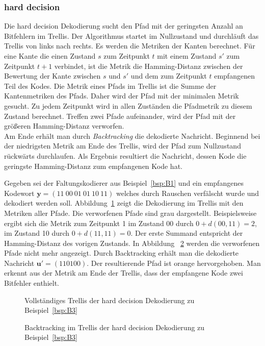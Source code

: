 \subsubsection{hard decision}
\label{kapitel:grundlagen_hard_decision}
Die hard decision Dekodierung sucht den Pfad mit der geringsten Anzahl an Bitfehlern im Trellis. Der Algorithmus startet im Nullzustand und durchläuft das Trellis von links nach rechts. Es werden die Metriken der Kanten berechnet. Für eine Kante die einen Zustand $s$ zum Zeitpunkt $t$ mit einem Zustand $s'$ zum Zeitpunkt $t+1$ verbindet, ist die Metrik die Hamming-Distanz zwischen der Bewertung der Kante zwischen $s$ und $s'$ und dem zum Zeitpunkt $t$ empfangenen Teil des Kodes. Die Metrik eines Pfads im Trellis ist die Summe der Kantenmetriken des Pfads. Daher wird der Pfad mit der minimalen Metrik gesucht. Zu jedem Zeitpunkt wird in allen Zuständen die Pfadmetrik zu diesem Zustand berechnet. Treffen zwei Pfade aufeinander, wird der Pfad mit der größeren Hamming-Distanz verworfen.
\\
Am Ende erhält man durch \emph{Backtracking} die dekodierte Nachricht. Beginnend bei der niedrigsten Metrik am Ende des Trellis, wird der Pfad zum Nullzustand rückwärts durchlaufen. Als Ergebnis resultiert die Nachricht, dessen Kode die geringste Hamming-Distanz zum empfangenen Kode hat.
\begin{beispiel}
Gegeben sei der Faltungskodierer aus Beispiel~\ref{bsp:B1} und ein empfangenes Kodewort $\mathbf{y}=\left( 11~00~01~01~10~11\right)$ welches durch Rauschen verfälscht wurde und dekodiert werden soll. Abbildung~\ref{abb:trellis_dek_hard_a} zeigt die Dekodierung im Trellis mit den Metriken aller Pfade. Die verworfenen Pfade sind grau dargestellt. Beispielsweise ergibt sich die Metrik zum Zeitpunkt 1 im Zustand 00 durch $0+d(00,11)=2$, im Zustand 10 durch $0+d(11,11)=0$. Der erste Summand entspricht der Hamming-Distanz des vorigen Zustands. In Abbildung~ \ref{abb:trellis_dek_hard_b} werden die verworfenen Pfade nicht mehr angezeigt. Durch Backtracking erhält man die dekodierte Nachricht $\mathbf{u'}=\left( 110100\right)$. Der resultierende Pfad ist orange hervorgehoben. Man erkennt aus der Metrik am Ende der Trellis, dass der empfangene Kode zwei Bitfehler enthielt.
\label{bsp:B3}
\end{beispiel}

\begin{figure}[t]
	\centering
	\resizebox{0.75\textwidth}{!}{%
		
	}
	\caption{Vollständiges Trellis der hard decision Dekodierung zu Beispiel~\ref{bsp:B3}}
	\label{abb:trellis_dek_hard_a}
\end{figure}
\begin{figure}[t]
	\centering
	\resizebox{0.75\textwidth}{!}{%
		
	}
	\caption{Backtracking im Trellis der hard decision Dekodierung zu Beispiel~\ref{bsp:B3}}
	\label{abb:trellis_dek_hard_b}
\end{figure}

